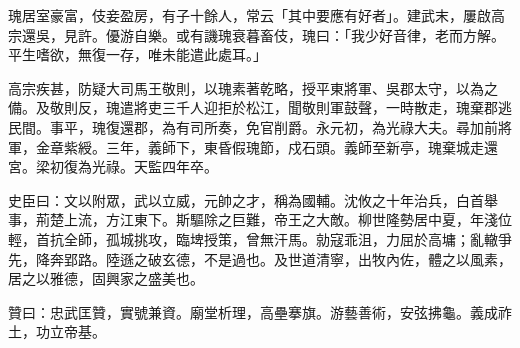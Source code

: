 \begin{pinyinscope}
 瑰居室豪富，伎妾盈房，有子十餘人，常云「其中要應有好者」。建武末，屢啟高宗還吳，見許。優游自樂。或有譏瑰衰暮畜伎，瑰曰：「我少好音律，老而方解。平生嗜欲，無復一存，唯未能遣此處耳。」



 高宗疾甚，防疑大司馬王敬則，以瑰素著乾略，授平東將軍、吳郡太守，以為之備。及敬則反，瑰遣將吏三千人迎拒於松江，聞敬則軍鼓聲，一時散走，瑰棄郡逃民間。事平，瑰復還郡，為有司所奏，免官削爵。永元初，為光祿大夫。尋加前將軍，金章紫綬。三年，義師下，東昏假瑰節，戍石頭。義師至新亭，瑰棄城走還宮。梁初復為光祿。天監四年卒。



 史臣曰：文以附眾，武以立威，元帥之才，稱為國輔。沈攸之十年治兵，白首舉事，荊楚上流，方江東下。斯驅除之巨難，帝王之大敵。柳世隆勢居中夏，年淺位輕，首抗全師，孤城挑攻，臨埤授策，曾無汗馬。勍寇乖沮，力屈於高墉；亂轍爭先，降奔郢路。陸遜之破玄德，不是過也。及世道清寧，出牧內佐，體之以風素，居之以雅德，固興家之盛美也。



 贊曰：忠武匡贊，實號兼資。廟堂析理，高壘搴旗。游藝善術，安弦拂龜。義成祚土，功立帝基。



\end{pinyinscope}